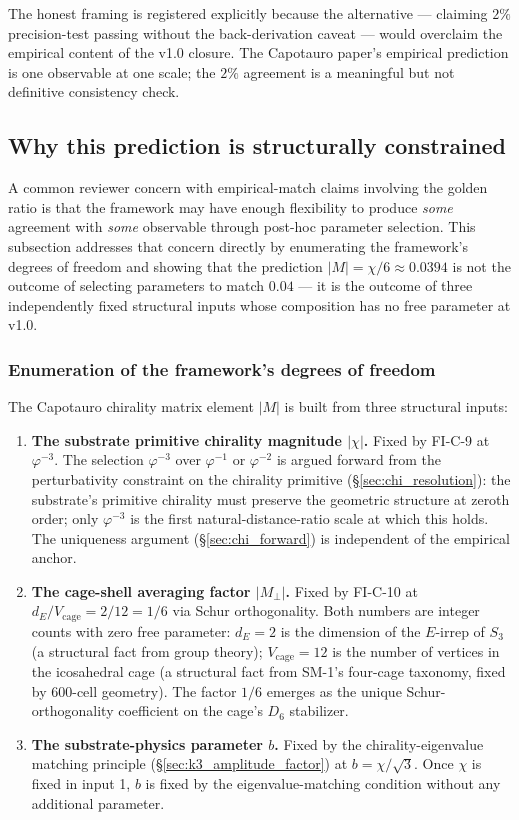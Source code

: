 \documentclass[11pt,letterpaper]{article}
\newcommand{\phig}{\varphi}
\newcommand{\Dsix}{D_6}
\newcommand{\Sthree}{S_3}
\begin{document}
The honest framing is registered explicitly because the alternative --- claiming $2\%$ precision-test passing without the back-derivation caveat --- would overclaim the empirical content of the v1.0 closure. The Capotauro paper's empirical prediction is one observable at one scale; the $2\%$ agreement is a meaningful but not definitive consistency check.

\subsection{Why this prediction is structurally constrained}\label{sec:nontriviality}

A common reviewer concern with empirical-match claims involving the golden ratio is that the framework may have enough flexibility to produce \emph{some} agreement with \emph{some} observable through post-hoc parameter selection. This subsection addresses that concern directly by enumerating the framework's degrees of freedom and showing that the prediction $|M| = \chi/6 \approx 0.0394$ is not the outcome of selecting parameters to match $0.04$ --- it is the outcome of three independently fixed structural inputs whose composition has no free parameter at v1.0.

\subsubsection{Enumeration of the framework's degrees of freedom}\label{sec:dof_enumeration}

The Capotauro chirality matrix element $|M|$ is built from three structural inputs:

\begin{enumerate}\setlength\itemsep{0.2em}
    \item \textbf{The substrate primitive chirality magnitude $|\chi|$.} Fixed by FI-C-9 at $\phig^{-3}$. The selection $\phig^{-3}$ over $\phig^{-1}$ or $\phig^{-2}$ is argued forward from the perturbativity constraint on the chirality primitive (\S\ref{sec:chi_resolution}): the substrate's primitive chirality must preserve the geometric structure at zeroth order; only $\phig^{-3}$ is the first natural-distance-ratio scale at which this holds. The uniqueness argument (\S\ref{sec:chi_forward}) is independent of the empirical anchor.
    \item \textbf{The cage-shell averaging factor $|M_\perp|$.} Fixed by FI-C-10 at $d_E/V_\text{cage} = 2/12 = 1/6$ via Schur orthogonality. Both numbers are integer counts with zero free parameter: $d_E = 2$ is the dimension of the $E$-irrep of $\Sthree$ (a structural fact from group theory); $V_\text{cage} = 12$ is the number of vertices in the icosahedral cage (a structural fact from SM-1's four-cage taxonomy, fixed by 600-cell geometry). The factor $1/6$ emerges as the unique Schur-orthogonality coefficient on the cage's $\Dsix$ stabilizer.
    \item \textbf{The substrate-physics parameter $b$.} Fixed by the chirality-eigenvalue matching principle (\S\ref{sec:k3_amplitude_factor}) at $b = \chi/\sqrt{3}$. Once $\chi$ is fixed in input 1, $b$ is fixed by the eigenvalue-matching condition without any additional parameter.
\end{enumerate}
\end{document}
